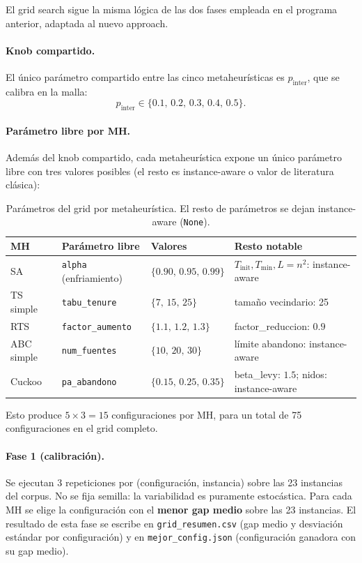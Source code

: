 El grid search sigue la misma lógica de las dos fases empleada en el
programa anterior, adaptada al nuevo approach.

\paragraph{Knob compartido.}
El único parámetro compartido entre las cinco metaheurísticas es
$p_{\text{inter}}$, que se calibra en la malla:
\[ p_{\text{inter}} \in \{0.1,\,0.2,\,0.3,\,0.4,\,0.5\}. \]

\paragraph{Parámetro libre por MH.}
Además del knob compartido, cada metaheurística expone un único
parámetro libre con tres valores posibles (el resto es instance-aware
o valor de literatura clásica):

\begin{table}[h]
\centering
\caption{Parámetros del grid por metaheurística. El resto de
         parámetros se dejan instance-aware (\texttt{None}).}
\label{tab:grid-solo-p-inter}
\small
\begin{tabular}{llll}
\toprule
MH & Parámetro libre & Valores & Resto notable \\
\midrule
SA           & \texttt{alpha} (enfriamiento)   & $\{0.90,\,0.95,\,0.99\}$  &
  $T_{\text{init}}, T_{\min}, L = n^2$: instance-aware \\
TS simple    & \texttt{tabu\_tenure}            & $\{7,\,15,\,25\}$         &
  tamaño vecindario: 25 \\
RTS          & \texttt{factor\_aumento}         & $\{1.1,\,1.2,\,1.3\}$    &
  factor\_reduccion: $0.9$ \\
ABC simple   & \texttt{num\_fuentes}            & $\{10,\,20,\,30\}$        &
  límite abandono: instance-aware \\
Cuckoo       & \texttt{pa\_abandono}            & $\{0.15,\,0.25,\,0.35\}$ &
  beta\_levy: $1.5$; nidos: instance-aware \\
\bottomrule
\end{tabular}
\end{table}

\noindent Esto produce $5 \times 3 = 15$ configuraciones por MH, para
un total de 75 configuraciones en el grid completo.

\paragraph{Fase 1 (calibración).}
Se ejecutan 3 repeticiones por (configuración, instancia) sobre las
23 instancias del corpus. No se fija semilla: la variabilidad es
puramente estocástica. Para cada MH se elige la configuración con el
\textbf{menor gap medio} sobre las 23 instancias. El resultado de esta
fase se escribe en \texttt{grid\_resumen.csv} (gap medio y desviación
estándar por configuración) y en \texttt{mejor\_config.json}
(configuración ganadora con su gap medio).

